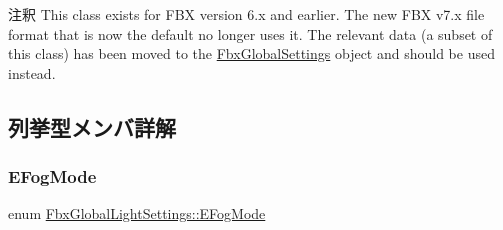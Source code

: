\begin{DoxyRemark}{注釈}
This class exists for F\+BX version 6.\+x and earlier. The new F\+BX v7.\+x file format that is now the default no longer uses it. The relevant data (a subset of this class) has been moved to the \hyperlink{class_fbx_global_settings}{Fbx\+Global\+Settings} object and should be used instead. 
\end{DoxyRemark}


\subsection{列挙型メンバ詳解}
\mbox{\label{class_fbx_global_light_settings_a2d6040cb267cbdb092bdf9fb73de8d6d}} 
\subsubsection{\texorpdfstring{E\+Fog\+Mode}{EFogMode}}
{\footnotesize\ttfamily enum \hyperlink{class_fbx_global_light_settings_a2d6040cb267cbdb092bdf9fb73de8d6d}{Fbx\+Global\+Light\+Settings\+::\+E\+Fog\+Mode}}

